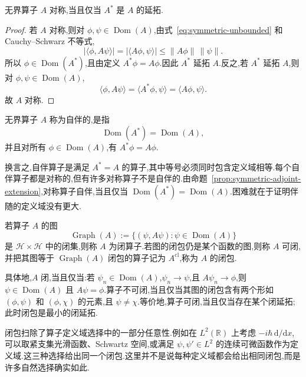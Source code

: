 \begin{proposition}[对称性与伴随]\label{prop:symmetric-adjoint-extension}
无界算子 \(A\) 对称,当且仅当 \(A^{*}\) 是 \(A\) 的延拓.
\end{proposition}

\begin{proof}
若 \(A\) 对称,则对 \(\phi,\psi\in\operatorname{Dom}(A)\),由式~\eqref{eq:symmetric-unbounded} 和 Cauchy--Schwarz 不等式,
\[
|\langle\phi,A\psi\rangle|=|\langle A\phi,\psi\rangle|
\leq\|A\phi\|\,\|\psi\|.
\]
所以 \(\phi\in\operatorname{Dom}(A^{*})\),且由定义 \(A^{*}\phi=A\phi\).因此 \(A^{*}\) 延拓 \(A\).反之,若 \(A^{*}\) 延拓 \(A\),则对 \(\phi,\psi\in\operatorname{Dom}(A)\),
\[
\langle\phi,A\psi\rangle=\langle A^{*}\phi,\psi\rangle=\langle A\phi,\psi\rangle.
\]
故 \(A\) 对称.
\end{proof}

\begin{definition}[自伴算子]\label{def:unbounded-selfadjoint}
无界算子 \(A\) 称为自伴的,是指
\[
\operatorname{Dom}(A^{*})=\operatorname{Dom}(A),
\]
并且对所有 \(\phi\in\operatorname{Dom}(A)\),有 \(A^{*}\phi=A\phi\).
\end{definition}

换言之,自伴算子是满足 \(A^{*}=A\) 的算子,其中等号必须同时包含定义域相等.每个自伴算子都是对称的,但有许多对称算子不是自伴的.由命题~\ref{prop:symmetric-adjoint-extension},对称算子自伴,当且仅当 \(\operatorname{Dom}(A^{*})=\operatorname{Dom}(A)\).困难就在于证明伴随的定义域没有更大.

\begin{definition}[闭算子与可闭算子]\label{def:closed-closable-operator}
若算子 \(A\) 的图
\[
\operatorname{Graph}(A):=\{(\psi,A\psi):\psi\in\operatorname{Dom}(A)\}
\]
是 \(\mathcal{H}\times\mathcal{H}\) 中的闭集,则称 \(A\) 为闭算子.若图的闭包仍是某个函数的图,则称 \(A\) 可闭,并把其图等于 \(\operatorname{Graph}(A)\) 闭包的算子记为 \(A^{\mathrm{cl}}\),称为 \(A\) 的闭包.
\end{definition}

具体地,\(A\) 闭,当且仅当:若 \(\psi_{n}\in\operatorname{Dom}(A)\),\(\psi_{n}\to\psi\),且 \(A\psi_{n}\to\phi\),则 \(\psi\in\operatorname{Dom}(A)\) 且 \(A\psi=\phi\).算子不可闭,当且仅当其图的闭包含有两个形如 \((\phi,\psi)\) 和 \((\phi,\chi)\) 的元素,且 \(\psi\neq\chi\).等价地,算子可闭,当且仅当存在某个闭延拓;此时闭包是最小的闭延拓.

闭包扫除了算子定义域选择中的一部分任意性.例如在 \(L^{2}(\mathbb{R})\) 上考虑 \(-i\hbar\,\mathrm{d}/\mathrm{d}x\),可以取紧支集光滑函数、Schwartz 空间,或满足 \(\psi,\psi'\in L^{2}\) 的连续可微函数作为定义域.这三种选择给出同一个闭包.这里并不是说每种定义域都会给出相同闭包,而是许多自然选择确实如此.

